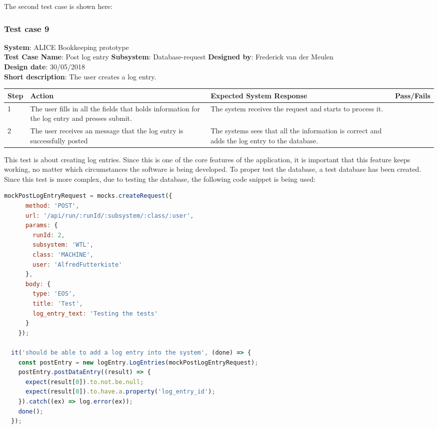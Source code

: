\documentclass[paper=a4, fontsize=11pt,twoside]{scrartcl}	%
\begin{document}
The second test case is shown here:
\subsubsection{Test case 9}
\textbf{System}:  ALICE Bookkeeping prototype \\
\textbf{Test Case Name}:  Post log entry
\textbf{Subsystem}:  Database-request
\textbf{Designed by}:  Frederick van der Meulen\\
\textbf{Design date}: 30/05/2018 \\
\textbf{Short description}: The user creates a log entry. \\

\begin{longtable}{ | p{0.8cm} | p{4.5cm} | p{6cm}  | p{1.5cm} |}
\hline
Step & Action & Expected System Response & Pass/Fails  \\ \hline
1 & The user fills in all the fields that holds information for the log entry and presses submit. & The system receives the request and starts to process it. &  \\ \hline
2 & The user receives an message that the log entry is successfully posted & The systems sees that all the information is correct and adds the log entry to the database. &  \\ \hline
\end{longtable}

This test is about creating log entries. Since this is one of the core features of the application, it is important that this feature keeps working, no matter which circumstances the software is being developed. To proper test the database, a test database has been created. 
Since this test is more complex, due to testing the database, the following code snippet is being used:

\begin{lstlisting}[language=JavaScript, frame=single]
mockPostLogEntryRequest = mocks.createRequest({
      method: 'POST',
      url: '/api/run/:runId/:subsystem/:class/:user',
      params: {
        runId: 2,
        subsystem: 'WTL',
        class: 'MACHINE',
        user: 'AlfredFutterkiste'
      },
      body: {
        type: 'EOS',
        title: 'Test',
        log_entry_text: 'Testing the tests'
      }
    });
    
  it('should be able to add a log entry into the system', (done) => {
    const postEntry = new logEntry.LogEntries(mockPostLogEntryRequest);
    postEntry.postDataEntry((result) => {
      expect(result[0]).to.not.be.null;
      expect(result[0]).to.have.a.property('log_entry_id');
    }).catch((ex) => log.error(ex));
    done();
  });


\end{lstlisting}
\end{document}
